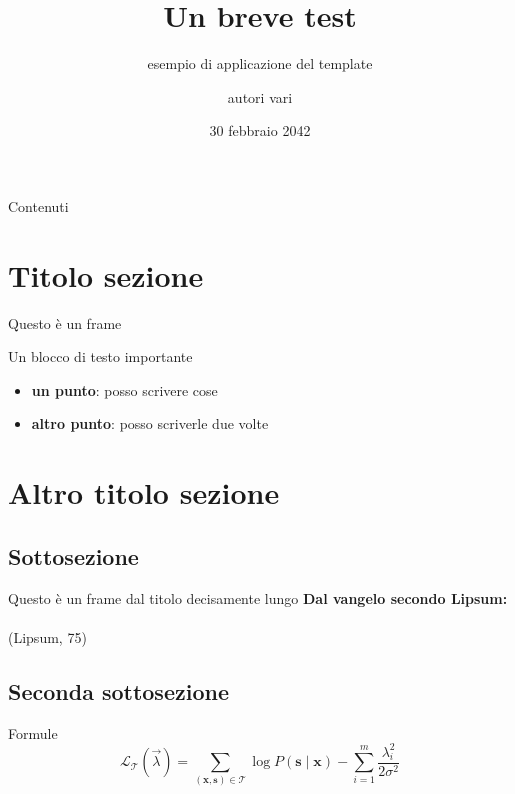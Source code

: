 \documentclass{beamer}
\title{Un breve test}
\subtitle{esempio di applicazione del template}
\author{autori vari}
\institute{Università di Trento}
\date{30 febbraio 2042}
\begin{document}

\begin{frame}
  \titlepage
\end{frame}

\begin{frame}{Contenuti}
  \tableofcontents
\end{frame}

\section{Titolo sezione}

\begin{frame}{Questo è un frame}
    \begin{block}{Un blocco di testo importante}
        \lipsum[66]
    \end{block}
    \pause
    \begin{itemize}
      \item \textbf{un punto}: posso scrivere cose
      \pause
      \item \textbf{altro punto}: posso scriverle due volte
    \end{itemize}
\end{frame}

\section{Altro titolo sezione}
\subsection{Sottosezione}
\begin{frame}{Questo è un frame dal titolo decisamente lungo}
    \textbf{Dal vangelo secondo Lipsum:} \\
    \pause
    \textit{\lipsum[75]} \\ 
    (Lipsum, 75)
\end{frame}

\subsection{Seconda sottosezione}

\begin{frame}{Formule}
    \[
    \mathcal L_{\mathcal T}(\vec{\lambda})
    = \sum_{(\mathbf{x},\mathbf{s})\in \mathcal T}
       \log P(\mathbf{s}\mid\mathbf{x}) - \sum_{i=1}^m
       \frac{\lambda_i^2}{2\sigma^2}
    \]
\end{frame}
\end{document}

